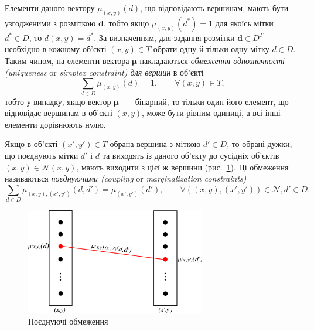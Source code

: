 Елементи даного вектору $\mu_{\left(x, y \right)} \left(d \right)$,
що відповідають вершинам, мають бути узгодженими з розміткою $\pmb{d}$,
тобто якщо $\mu_{\left(x, y \right)} \left(d^* \right) = 1$ для якоїсь мітки
$d^* \in D$,
то $d \left(x, y \right) = d^*$.
За визначенням, для задання розмітки $\pmb{d} \in D^T$
необхідно в кожному об'єкті $\left(x, y \right) \in T$
обрати одну й тільки одну мітку $d \in D$.
Таким чином, на елементи вектора $\pmb{\mu}$ накладаються
\textit{обмеження однозначності (uniqueness} or
\textit{simplex constraint) для вершин} в об'єкті
\begin{equation} \label{eq:vetrex:unambiguity}
    \sum \limits_{d \in D} \mu_{\left( x, y \right)} \left( d \right) = 1,
    \qquad \forall \left(x, y \right) \in T,
\end{equation}
тобто у випадку, якщо вектор $\pmb{\mu}$~---~бінарний,
то тільки один його елемент,
що відповідає вершинам в об'єкті $\left(x, y \right)$, може бути рівним одиниці,
а всі інші елементи дорівнюють нулю.

Якщо в об'єкті $\left(x', y' \right) \in T$ обрана вершина з міткою $d' \in D$,
то обрані дужки, що поєднують мітки $d'$ і $d$
та виходять із даного об'єкту до сусідніх об'єктів
$\left(x, y \right) \in \mathcal{N} \left(x, y \right)$,
мають виходити з цієї ж вершини (рис.~\ref{fig:combining:constraints}).
Ці обмеження називаються
\textit{поєднуючими (coupling} or \textit{marginalization constraints)}
\begin{equation} \label{eq:combining:constraints}
    \sum \limits_{d \in D}
        \mu_{\left(x, y \right), \left(x', y' \right)} \left(d, d' \right) =
        \mu_{\left(x', y' \right)} \left(d' \right), \qquad
    \forall
    \left( \left(x, y \right), \left(x',y' \right) \right) \in \mathcal{N},
    d' \in D.
\end{equation}

\begin{figure}[h]
  \centering
  \includegraphics[width=0.7\textwidth]{images/combining_constraints}
  \caption{Поєднуючі обмеження}
  \label{fig:combining:constraints}
\end{figure}


